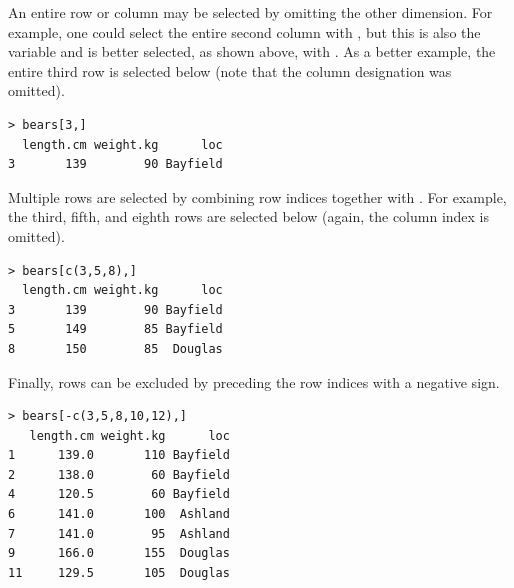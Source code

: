 \documentclass[10pt,openany]{book}\usepackage[]{graphicx}\usepackage[]{color}
\makeatletter
\newenvironment{kframe}{%
 \def\at@end@of@kframe{}%
 \ifinner\ifhmode%
  \def\at@end@of@kframe{\end{minipage}}%
  \begin{minipage}{\columnwidth}%
 \fi\fi%
 \def\FrameCommand##1{\hskip\@totalleftmargin \hskip-\fboxsep
 \colorbox{shadecolor}{##1}\hskip-\fboxsep
     \hskip-\linewidth \hskip-\@totalleftmargin \hskip\columnwidth}%
 \MakeFramed {\advance\hsize-\width
   \@totalleftmargin\z@ \linewidth\hsize
   \@setminipage}}%
 {\par\unskip\endMakeFramed%
 \at@end@of@kframe}
\newenvironment{knitrout}{}{} %
\makeatother
\begin{document}
An entire row or column may be selected by omitting the other dimension. For example, one could select the entire second column with , but this is also the  variable and is better selected, as shown above, with . As a better example, the entire third row is selected below (note that the column designation was omitted).
\vspace{-4pt}
\begin{knitrout}
\color{fgcolor}\begin{kframe}
\begin{verbatim}
> bears[3,]
  length.cm weight.kg      loc
3       139        90 Bayfield
\end{verbatim}
\end{kframe}
\end{knitrout}

Multiple rows are selected by combining row indices together with . For example, the third, fifth, and eighth rows are selected below (again, the column index is omitted).
\vspace{-4pt}
\begin{knitrout}
\color{fgcolor}\begin{kframe}
\begin{verbatim}
> bears[c(3,5,8),]
  length.cm weight.kg      loc
3       139        90 Bayfield
5       149        85 Bayfield
8       150        85  Douglas
\end{verbatim}
\end{kframe}
\end{knitrout}

Finally, rows can be excluded by preceding the row indices with a negative sign.
\vspace{-4pt}
\begin{knitrout}
\color{fgcolor}\begin{kframe}
\begin{verbatim}
> bears[-c(3,5,8,10,12),]
   length.cm weight.kg      loc
1      139.0       110 Bayfield
2      138.0        60 Bayfield
4      120.5        60 Bayfield
6      141.0       100  Ashland
7      141.0        95  Ashland
9      166.0       155  Douglas
11     129.5       105  Douglas
\end{verbatim}
\end{kframe}
\end{knitrout}
\end{document}
